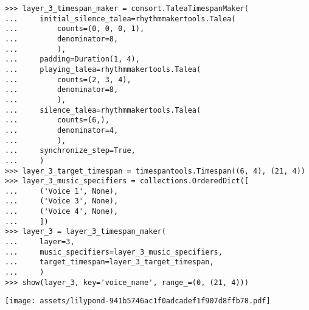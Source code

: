 \begin{comment}
<abjad>
layer_3_timespan_maker = consort.TaleaTimespanMaker(
    initial_silence_talea=rhythmmakertools.Talea(
        counts=(0, 0, 0, 1),
        denominator=8,
        ),
    padding=Duration(1, 4),
    playing_talea=rhythmmakertools.Talea(
        counts=(2, 3, 4),
        denominator=8,
        ),
    silence_talea=rhythmmakertools.Talea(
        counts=(6,),
        denominator=4,
        ),
    synchronize_step=True,
    )
layer_3_target_timespan = timespantools.Timespan((6, 4), (21, 4))
layer_3_music_specifiers = collections.OrderedDict([
    ('Voice 1', None),
    ('Voice 3', None),
    ('Voice 4', None),
    ])
layer_3 = layer_3_timespan_maker(
    layer=3,
    music_specifiers=layer_3_music_specifiers,
    target_timespan=layer_3_target_timespan,
    )
show(layer_3, key='voice_name', range_=(0, (21, 4)))
</abjad>
\end{comment}

\begin{abjadbookoutput}
\begin{singlespacing}
\vspace{-0.5\baselineskip}
\begin{lstlisting}
>>> layer_3_timespan_maker = consort.TaleaTimespanMaker(
...     initial_silence_talea=rhythmmakertools.Talea(
...         counts=(0, 0, 0, 1),
...         denominator=8,
...         ),
...     padding=Duration(1, 4),
...     playing_talea=rhythmmakertools.Talea(
...         counts=(2, 3, 4),
...         denominator=8,
...         ),
...     silence_talea=rhythmmakertools.Talea(
...         counts=(6,),
...         denominator=4,
...         ),
...     synchronize_step=True,
...     )
>>> layer_3_target_timespan = timespantools.Timespan((6, 4), (21, 4))
>>> layer_3_music_specifiers = collections.OrderedDict([
...     ('Voice 1', None),
...     ('Voice 3', None),
...     ('Voice 4', None),
...     ])
>>> layer_3 = layer_3_timespan_maker(
...     layer=3,
...     music_specifiers=layer_3_music_specifiers,
...     target_timespan=layer_3_target_timespan,
...     )
>>> show(layer_3, key='voice_name', range_=(0, (21, 4)))
\end{lstlisting}
\noindent\texttt{[image: assets/lilypond-941b5746ac1f0adcadef1f907d8ffb78.pdf]}
\end{singlespacing}
\end{abjadbookoutput}

